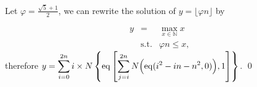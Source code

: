 
\begin{pf} \rm
Let $\varphi = \frac{\sqrt{5}+1}{2}$, we can rewrite the solution of 
$y=\lfloor \varphi n\rfloor$ by

\[
\begin{array}{rcl}
 y &= & \displaystyle \max_{x\in\mathbb{N}} x \\
 & \mathrm{s.t.} & \varphi n \leq x,
\end{array}
\]
\noindent
therefore
$ \displaystyle y = 
 \sum_{i = 0}^{2n}
 i\times N \left\{
 \mathrm{eq} \left[
  \sum_{j = i}^{2n} N\Big(\mathrm{eq}(i^2 - in - n^2, 0)\Big)
 , 1
 \right] \right\} $.
\qed
\end{pf}

